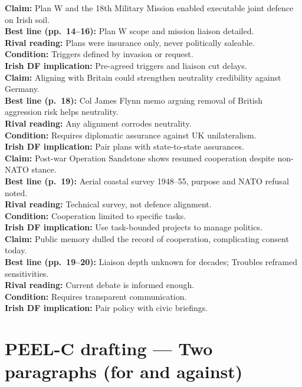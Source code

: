 \textbf{Claim:} Plan W and the 18th Military Mission enabled executable joint defence on Irish soil.\\
\textbf{Best line (pp.~14--16):} Plan W scope and mission liaison detailed.\\
\textbf{Rival reading:} Plans were insurance only, never politically saleable.\\
\textbf{Condition:} Triggers defined by invasion or request.\\
\textbf{Irish DF implication:} Pre-agreed triggers and liaison cut delays.\\[0.5em]

\textbf{Claim:} Aligning with Britain could strengthen neutrality credibility against Germany.\\
\textbf{Best line (p.~18):} Col James Flynn memo arguing removal of British aggression risk helps neutrality.\\
\textbf{Rival reading:} Any alignment corrodes neutrality.\\
\textbf{Condition:} Requires diplomatic assurance against UK unilateralism.\\
\textbf{Irish DF implication:} Pair plans with state-to-state assurances.\\[0.5em]

\textbf{Claim:} Post-war Operation Sandstone shows resumed cooperation despite non-NATO stance.\\
\textbf{Best line (p.~19):} Aerial coastal survey 1948--55, purpose and NATO refusal noted.\\
\textbf{Rival reading:} Technical survey, not defence alignment.\\
\textbf{Condition:} Cooperation limited to specific tasks.\\
\textbf{Irish DF implication:} Use task-bounded projects to manage politics.\\[0.5em]

\textbf{Claim:} Public memory dulled the record of cooperation, complicating consent today.\\
\textbf{Best line (pp.~19--20):} Liaison depth unknown for decades; Troubles reframed sensitivities.\\
\textbf{Rival reading:} Current debate is informed enough.\\
\textbf{Condition:} Requires transparent communication.\\
\textbf{Irish DF implication:} Pair policy with civic briefings.\\

\section*{PEEL-C drafting --- Two paragraphs (for and against)}

